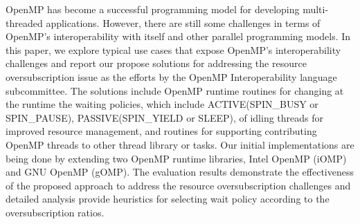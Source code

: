 OpenMP has become a successful programming model
for developing multi-threaded applications.
However, there are still some challenges in terms of OpenMP's interoperability
with itself and other parallel programming models.
In this paper, we explore typical use cases that expose OpenMP's interoperability challenges and
report our propose solutions for addressing the resource oversubscription issue as the efforts
by the OpenMP Interoperability language subcommittee. 
The solutions include OpenMP runtime routines for
changing at the runtime the waiting policies, which include ACTIVE(SPIN\_BUSY or SPIN\_PAUSE), 
PASSIVE(SPIN\_YIELD or SLEEP), 
of idling threads for improved resource management, and 
routines for supporting contributing OpenMP threads to other thread library or tasks. 
Our initial implementations are being done by extending two OpenMP runtime libraries, 
Intel OpenMP (iOMP) and GNU OpenMP (gOMP).
The evaluation results demonstrate the effectiveness of the proposed approach to address the resource 
oversubscription challenges and detailed analysis provide heuristics for selecting wait policy according
to the oversubscription ratios. 


